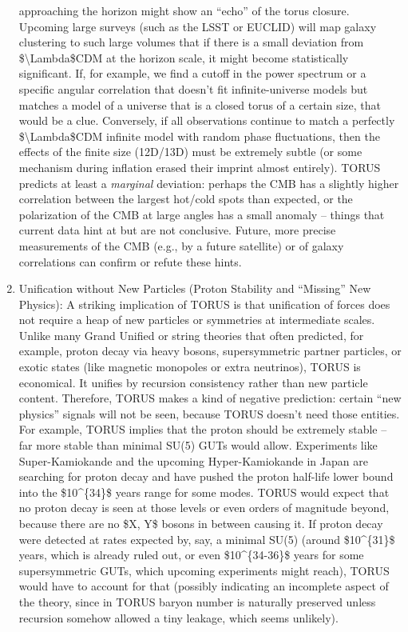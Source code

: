 \documentclass[
]{article}
\begin{document}
\begin{enumerate}
  approaching the horizon might show an ``echo'' of the torus closure.
  Upcoming large surveys (such as the LSST or EUCLID) will map galaxy
  clustering to such large volumes that if there is a small deviation
  from \$\textbackslash Lambda\$CDM at the horizon scale, it might
  become statistically significant. If, for example, we find a cutoff in
  the power spectrum or a specific angular correlation that doesn't fit
  infinite-universe models but matches a model of a universe that is a
  closed torus of a certain size, that would be a clue. Conversely, if
  all observations continue to match a perfectly
  \$\textbackslash Lambda\$CDM infinite model with random phase
  fluctuations, then the effects of the finite size (12D/13D) must be
  extremely subtle (or some mechanism during inflation erased their
  imprint almost entirely). TORUS predicts at least a \emph{marginal}
  deviation: perhaps the CMB has a slightly higher correlation between
  the largest hot/cold spots than expected, or the polarization of the
  CMB at large angles has a small anomaly -- things that current data
  hint at but are not conclusive. Future, more precise measurements of
  the CMB (e.g., by a future satellite) or of galaxy correlations can
  confirm or refute these hints.
\item
  Unification without New Particles (Proton Stability and ``Missing''
  New Physics): A striking implication of TORUS is that unification of
  forces does not require a heap of new particles or symmetries at
  intermediate scales. Unlike many Grand Unified or string theories that
  often predicted, for example, proton decay via heavy bosons,
  supersymmetric partner particles, or exotic states (like magnetic
  monopoles or extra neutrinos), TORUS is economical. It unifies by
  recursion consistency rather than new particle content. Therefore,
  TORUS makes a kind of negative prediction: certain ``new physics''
  signals will not be seen, because TORUS doesn't need those entities.
  For example, TORUS implies that the proton should be extremely stable
  -- far more stable than minimal SU(5) GUTs would allow. Experiments
  like Super-Kamiokande and the upcoming Hyper-Kamiokande in Japan are
  searching for proton decay and have pushed the proton half-life lower
  bound into the \$10\^{}\{34\}\$ years range for some modes. TORUS
  would expect that no proton decay is seen at those levels or even
  orders of magnitude beyond, because there are no \$X, Y\$ bosons in
  between causing it. If proton decay were detected at rates expected
  by, say, a minimal SU(5) (around \$10\^{}\{31\}\$ years, which is
  already ruled out, or even \$10\^{}\{34-36\}\$ years for some
  supersymmetric GUTs, which upcoming experiments might reach), TORUS
  would have to account for that (possibly indicating an incomplete
  aspect of the theory, since in TORUS baryon number is naturally
  preserved unless recursion somehow allowed a tiny leakage, which seems
  unlikely).
\end{enumerate}
\end{document}
